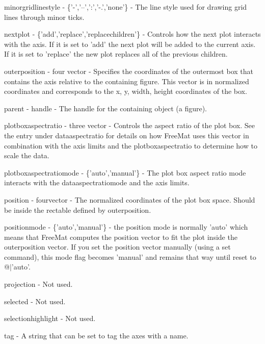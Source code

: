 \begin{DoxyItemize}
\item {\ttfamily minorgridlinestyle} -\/ {\ttfamily \{'-\/','--','\-:','-\/.','none'\}} -\/ The line style used for drawing grid lines through minor ticks.  
\item {\ttfamily nextplot} -\/ {\ttfamily \{'add','replace','replacechildren'\}} -\/ Controls how the next plot interacts with the axis. If it is set to {\ttfamily 'add'} the next plot will be added to the current axis. If it is set to {\ttfamily 'replace'} the new plot replaces all of the previous children.  
\item {\ttfamily outerposition} -\/ {\ttfamily four vector} -\/ Specifies the coordinates of the outermost box that contains the axis relative to the containing figure. This vector is in normalized coordinates and corresponds to the {\ttfamily x, y, width, height} coordinates of the box.  
\item {\ttfamily parent} -\/ {\ttfamily handle} -\/ The handle for the containing object (a figure).  
\item {\ttfamily plotboxaspectratio} -\/ {\ttfamily three vector} -\/ Controls the aspect ratio of the plot box. See the entry under {\ttfamily dataaspectratio} for details on how Free\-Mat uses this vector in combination with the axis limits and the {\ttfamily plotboxaspectratio} to determine how to scale the data.  
\item {\ttfamily plotboxaspectratiomode} -\/ {\ttfamily \{'auto','manual'\}} -\/ The plot box aspect ratio mode interacts with the {\ttfamily dataaspectratiomode} and the axis limits.  
\item {\ttfamily position} -\/ {\ttfamily fourvector} -\/ The normalized coordinates of the plot box space. Should be inside the rectable defined by {\ttfamily outerposition}.  
\item {\ttfamily positionmode} -\/ {\ttfamily \{'auto','manual'\}} -\/ the position mode is normally {\ttfamily 'auto'} which means that Free\-Mat computes the position vector to fit the plot inside the {\ttfamily outerposition} vector. If you set the {\ttfamily position} vector manually (using a {\ttfamily set} command), this {\ttfamily mode} flag becomes {\ttfamily 'manual'} and remains that way until reset to @$|$'auto'.  
\item {\ttfamily projection} -\/ Not used.  
\item {\ttfamily selected} -\/ Not used.  
\item {\ttfamily selectionhighlight} -\/ Not used.  
\item {\ttfamily tag} -\/ A string that can be set to tag the axes with a name.  

\end{DoxyItemize}
